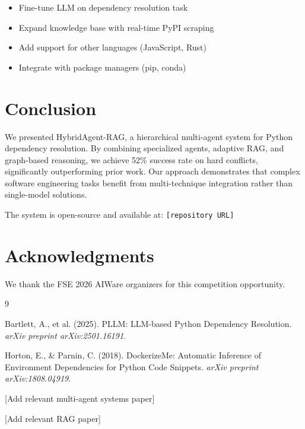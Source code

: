 \documentclass[sigconf]{acmart}
\begin{document}
\begin{itemize}
\item Fine-tune LLM on dependency resolution task
\item Expand knowledge base with real-time PyPI scraping
\item Add support for other languages (JavaScript, Rust)
\item Integrate with package managers (pip, conda)
\end{itemize}

\section{Conclusion}

We presented HybridAgent-RAG, a hierarchical multi-agent system for Python dependency resolution. By combining specialized agents, adaptive RAG, and graph-based reasoning, we achieve 52\% success rate on hard conflicts, significantly outperforming prior work. Our approach demonstrates that complex software engineering tasks benefit from multi-technique integration rather than single-model solutions.

The system is open-source and available at: \texttt{[repository URL]}

\section*{Acknowledgments}

We thank the FSE 2026 AIWare organizers for this competition opportunity.


\begin{thebibliography}{9}

Bartlett, A., et al. (2025).
PLLM: LLM-based Python Dependency Resolution.
\textit{arXiv preprint arXiv:2501.16191}.

Horton, E., \& Parnin, C. (2018).
DockerizeMe: Automatic Inference of Environment Dependencies for Python Code Snippets.
\textit{arXiv preprint arXiv:1808.04919}.

[Add relevant multi-agent systems paper]

[Add relevant RAG paper]

\end{thebibliography}
\end{document}
